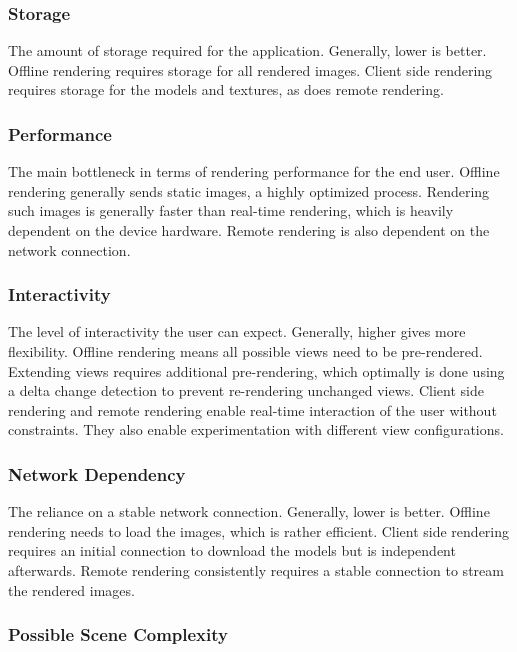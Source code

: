 \subsubsection{Storage}

The amount of storage required for the application. Generally, lower is better. Offline rendering requires storage for all rendered images. Client side rendering requires storage for the models and textures, as does remote rendering.

\subsubsection{Performance}

The main bottleneck in terms of rendering performance for the end user. Offline rendering generally sends static images, a highly optimized process. Rendering such images is generally faster than real-time rendering, which is heavily dependent on the device hardware. Remote rendering is also dependent on the network connection.

\subsubsection{Interactivity}

The level of interactivity the user can expect. Generally, higher gives more flexibility. Offline rendering means all possible views need to be pre-rendered. Extending views requires additional pre-rendering, which optimally is done using a delta change detection to prevent re-rendering unchanged views. Client side rendering and remote rendering enable real-time interaction of the user without constraints. They also enable experimentation with different view configurations.

\subsubsection{Network Dependency}

The reliance on a stable network connection. Generally, lower is better. Offline rendering needs to load the images, which is rather efficient. Client side rendering requires an initial connection to download the models but is independent afterwards. Remote rendering consistently requires a stable connection to stream the rendered images.

\subsubsection{Possible Scene Complexity}

